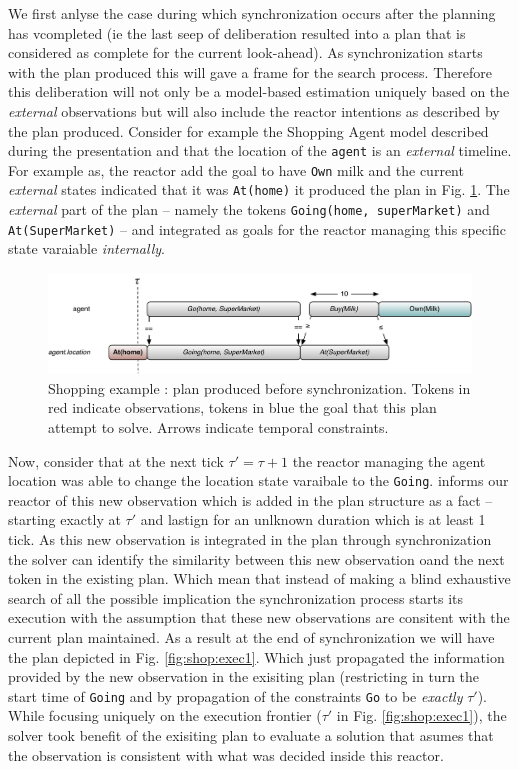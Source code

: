 We first anlyse the case during which synchronization occurs after the
planning has vcompleted (ie the last seep of deliberation resulted
into a plan that is considered as complete for the current
look-ahead). As synchronization starts with the plan produced this
will gave a frame for the search process. Therefore this deliberation
will not only be a model-based estimation uniquely based on the {\em
  external} observations but will also include the reactor intentions
as described by the plan produced. Consider for example the Shopping
Agent model described during the \eu presentation and that the
location of the \texttt{agent} is an {\em external} timeline. For
example as, the reactor add the goal to have \texttt{Own} milk and the
current {\em external} states indicated that it was \texttt{At(home)}
it produced the plan in Fig. \ref{fig:shop:exec0}. The {\em external}
part of the plan -- namely the tokens \texttt{Going(home,
  superMarket)} and \texttt{At(SuperMarket)} -- and integrated as
goals for the reactor managing this specific state varaiable {\em
  internally}.

\begin{figure}[!htb]
  \centering
  \includegraphics[width=0.7\columnwidth]{figs/shoping_exec_t0}
  \caption{Shopping example : plan produced before synchronization. 
    Tokens in red indicate observations, 
    tokens in blue the goal that this plan attempt to solve. Arrows
    indicate temporal constraints.}
  \label{fig:shop:exec0}
\end{figure}

Now, consider that at the next tick $\tau' = \tau+1$ the reactor managing the
agent location was able to change the location state varaibale to the
\texttt{Going}. \rx informs our reactor of this new observation which
is added in the plan structure as a fact -- starting exactly at
$\tau'$ and lastign for an unlknown duration which is at least 1
tick. As this new observation is integrated in the plan through
synchronization the solver can identify the similarity between this
new observation oand the next token in the existing plan. Which mean
that instead of making a blind exhaustive search of all the possible
implication the synchronization process starts its execution with the
assumption that these new observations are consitent with the current
plan maintained. As a result at the end of synchronization we will
have the plan depicted in Fig. \ref{fig:shop:exec1}. Which just
propagated the information provided by the new observation in the
exisiting plan (restricting in turn the start time of \texttt{Going}
and by propagation of the constraints \texttt{Go} to be {\em exactly}
$\tau'$). While focusing uniquely on the execution frontier ($\tau'$
in Fig. \ref{fig:shop:exec1}), the \eu solver took benefit of the
exisiting plan to evaluate a solution that asumes that the observation
is consistent with what was decided inside this reactor.


